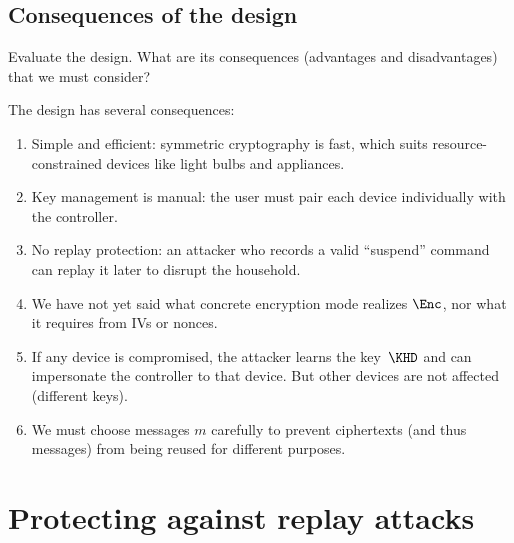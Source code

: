 \subsection{Consequences of the design}\label{EnergyConsequencesFirst}

\begin{exercise}
  Evaluate the design.
  What are its consequences (advantages and disadvantages) that we must
  consider?
\end{exercise}

The design has several consequences:
\begin{enumerate}
  \item Simple and efficient: symmetric cryptography is fast, which suits
    resource-constrained devices like light bulbs and appliances.
  \item Key management is manual: the user must pair each device individually
    with the controller.
  \item No replay protection: an attacker who records a valid
    \enquote{suspend} command can replay it later to disrupt the household.
  \item We have not yet said what concrete encryption mode realizes
    \(\Enc\), nor what it requires from IVs or nonces.
  \item If any device is compromised, the attacker learns the key~\(\KHD\)
    and can impersonate the controller to that device.
    But other devices are not affected (different keys).
  \item We must choose messages \(m\) carefully to prevent ciphertexts (and
    thus messages) from being reused for different purposes.
\end{enumerate}


\section{Protecting against replay attacks}\label{EnergyReplayProtection}



